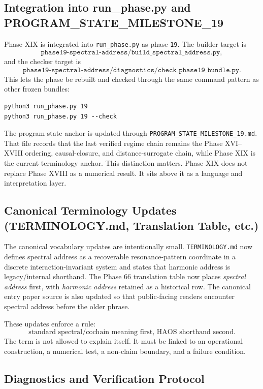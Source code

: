 \documentclass[11pt]{article}
\begin{document}
\subsection{Integration into run\_phase.py and PROGRAM\_STATE\_MILESTONE\_19}

Phase XIX is integrated into \texttt{run\_phase.py} as phase \texttt{19}. The builder target is
\[
\texttt{phase19-spectral-address/build\_spectral\_address.py},
\]
and the checker target is
\[
\texttt{phase19-spectral-address/diagnostics/check\_phase19\_bundle.py}.
\]
This lets the phase be rebuilt and checked through the same command pattern as other frozen bundles:

\begin{verbatim}
python3 run_phase.py 19
python3 run_phase.py 19 --check
\end{verbatim}

The program-state anchor is updated through \texttt{PROGRAM\_STATE\_MILESTONE\_19.md}. That file records that the last verified regime chain remains the Phase XVI--XVIII ordering, causal-closure, and distance-surrogate chain, while Phase XIX is the current terminology anchor. This distinction matters. Phase XIX does not replace Phase XVIII as a numerical result. It sits above it as a language and interpretation layer.

\subsection{Canonical Terminology Updates (TERMINOLOGY.md, Translation Table, etc.)}

The canonical vocabulary updates are intentionally small. \texttt{TERMINOLOGY.md} now defines spectral address as a recoverable resonance-pattern coordinate in a discrete interaction-invariant system and states that harmonic address is legacy/internal shorthand. The Phase 66 translation table now places \emph{spectral address} first, with \emph{harmonic address} retained as a historical row. The canonical entry paper source is also updated so that public-facing readers encounter spectral address before the older phrase.

These updates enforce a rule:
\[
\text{standard spectral/cochain meaning first, HAOS shorthand second.}
\]
The term is not allowed to explain itself. It must be linked to an operational construction, a numerical test, a non-claim boundary, and a failure condition.

\subsection{Diagnostics and Verification Protocol}
\end{document}
